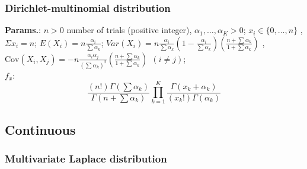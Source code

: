     
        
\subsubsection{Dirichlet-multinomial distribution}





    {\color{darkblue} \textbf{Params.}:} {$n > 0$ number of trials (positive integer),  $\alpha_1, \ldots, \alpha_{K}>0$}; {$x_i \in \{0,\dots,n\}$ ,  $\Sigma x_i = n\!$}; {$E(X_i) = n\frac{\alpha_i}{\sum \alpha_k}$}; {$Var(X_i) = n\frac{\alpha_i}{\sum \alpha_k}\left(1-\frac{\alpha_i}{\sum \alpha_k}\right)\left(\frac{n+\sum \alpha_k}{1+\sum \alpha_k}\right)$ ,  $\textstyle {\mathrm{Cov}}(X_i,X_j) = - n \frac{\alpha_i \alpha_j}{(\sum \alpha_k)^2} \left(\frac{n+\sum \alpha_k}{1+\sum \alpha_k}\right)~~(i\neq j)$};\hspace{0.5cm}\\{\color{darkblue} \textbf{$f_x$}:} {$$\frac{\left(n!\right)\Gamma\left(\sum \alpha_k\right)}
{\Gamma\left(n+\sum \alpha_k\right)}\prod_{k=1}^K\frac{\Gamma(x_{k}+\alpha_{k})}{\left(x_{k}!\right)\Gamma(\alpha_{k})}$$}



    

        
            \subsection{Continuous}

            
    
        
\subsubsection{Multivariate Laplace distribution}





